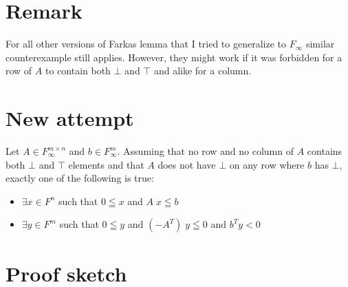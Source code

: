 \documentclass[]{article}
\begin{document}
\section{Remark}

For all other versions of Farkas lemma
that I tried to generalize to $F_\infty$
similar counterexample still applies.
However, they might work if it was forbidden
for a row of $A$ to contain both $\bot$ and $\top$
and alike for a column.


\section{New attempt}

Let $A \in F_\infty^{m \times n}$ and $b \in F_\infty^m$.
Assuming that no row and no column of $A$ contains
both $\bot$ and $\top$ elements and that
$A$ does not have $\bot$ on any row where $b$ has $\bot$,
exactly one of the following is true:
\begin{itemize}
	\item $\exists x \in F^n$ such that
	$0 \leqq x$ and $A\; x \leqq b$
	\item $\exists y \in F^m$ such that
	$0 \leqq y$ and $(-A^T)\; y \leqq 0$ and $b^T y < 0$
\end{itemize}

\section{Proof sketch}

\renewcommand{\labelitemii}{$\blacklozenge$}
\end{document}
